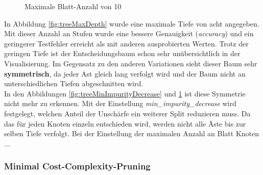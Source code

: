 \begin{figure}[H]
\begin{minipage}{0.30\textwidth}
        \caption{Maximale Blatt-Anzahl von 10}
        \label{fig:treeMaxLeafNodes}
    \end{minipage}
\end{figure}
\noindent \hspace*{7mm}
In Abbildung \ref{fig:treeMaxDepth} wurde eine maximale Tiefe von acht angegeben. Mit dieser Anzahl an Stufen wurde eine bessere Genauigkeit (\emph{accuracy}) und ein geringerer Testfehler erreicht als mit anderen ausprobierten Werten. Trotz der geringen Tiefe ist der Entscheidungsbaum schon sehr unübersichtlich in der Visualisierung. Im Gegensatz zu den anderen Variationen sieht dieser Baum sehr \textbf{symmetrisch}, da jeder Ast gleich lang verfolgt wird und der Baum nicht an unterschiedlichen Tiefen abgeschnitten wird.\\
\noindent \hspace*{7mm}
In den Abbildungen \ref{fig:treeMinImpurityDecrease} und \ref{fig:treeMaxLeafNodes} ist diese Symmetrie nicht mehr zu erkennen. Mit der Einstellung \emph{min\_impurity\_decrease} wird festgelegt, welchen Anteil der Unschärfe ein weiterer Split reduzieren muss. Da das für jeden Knoten einzeln entschieden wird, werden nicht alle Äste bis zur selben Tiefe verfolgt. Bei der Einstellung der maximalen Anzahl an Blatt Knoten ...
\subsubsection{Minimal Cost-Complexity-Pruning}
